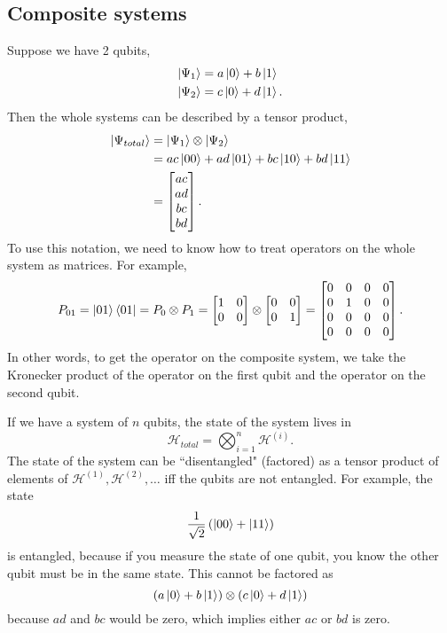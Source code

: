 \documentclass{article}
\begin{document}
\subsection{Composite systems}
Suppose we have 2 qubits,
\begin{align*}
    \left\lvert \Psi_1 \right\rangle &= a \left\lvert 0 \right\rangle + b \left\lvert 1 \right\rangle \\
    \left\lvert \Psi_2 \right\rangle &= c \left\lvert 0 \right\rangle + d \left\lvert 1 \right\rangle.
\end{align*}
Then the whole systems can be described by a tensor product,
\begin{align*}
    \left\lvert \Psi_{total} \right\rangle &= \left\lvert \Psi_1 \right\rangle \otimes \left\lvert \Psi_2 \right\rangle \\
                       &= ac \left\lvert 00 \right\rangle + ad \left\lvert 01 \right\rangle + bc \left\lvert 10 \right\rangle +bd \left\lvert 11 \right\rangle \\
                       &= \begin{bmatrix}
                           ac \\
                           ad \\
                           bc \\
                           bd
                       \end{bmatrix}.
\end{align*}
To use this notation, we need to know how to treat operators on the whole system as matrices. For example,
\[ P_{01}=\left\lvert 01 \right\rangle\left\langle 01 \right\rvert=P_0\otimes P_1 = \begin{bmatrix}
    1 & 0 \\
    0 & 0
\end{bmatrix} \otimes \begin{bmatrix}
    0 & 0 \\
    0 & 1
\end{bmatrix} = \begin{bmatrix}
    0 & 0 & 0 & 0 \\
    0 & 1 & 0 & 0 \\
    0 & 0 & 0 & 0 \\
    0 & 0 & 0 & 0
\end{bmatrix}. \]
In other words, to get the operator on the composite system, we take the Kronecker product of the operator on the first qubit and the operator on the second qubit.
\par
If we have a system of $n$ qubits, the state of the system lives in
\[ \mathcal{H}_{total} = \bigotimes_{i=1}^n \mathcal{H}^{(i)}. \]
The state of the system can be ``disentangled" (factored) as a tensor product of elements of $\mathcal{H}^{(1)}, \mathcal{H}^{(2)}, \dots$ iff the qubits are not entangled. For example, the state
\[ \frac{1}{\sqrt{2}} \left( \left\lvert 00 \right\rangle + \left\lvert 11 \right\rangle \right) \]
is entangled, because if you measure the state of one qubit, you know the other qubit must be in the same state. This cannot be factored as
\[ (a \left\lvert 0 \right\rangle + b \left\lvert 1 \right\rangle) \otimes (c \left\lvert 0 \right\rangle + d \left\lvert 1 \right\rangle) \]
because $ad$ and $bc$ would be zero, which implies either $ac$ or $bd$ is zero.
\end{document}
